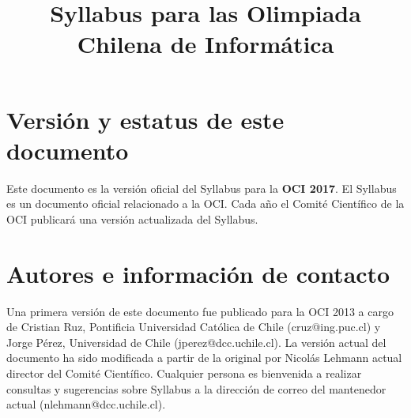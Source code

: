 \documentclass{article}
\begin{document}
\title{Syllabus para las Olimpiada Chilena de Informática}
\date{}
\maketitle

\section{Versión y estatus de este documento}
Este documento es la versión oficial del Syllabus para la \textbf{OCI 2017}.
El Syllabus es un documento oficial relacionado a la OCI.
Cada año el Comité Científico de la OCI publicará una versión actualizada del Syllabus.

\section{Autores e información de contacto}
Una primera versión de este documento fue publicado para la OCI 2013 a cargo de
Cristian Ruz, Pontificia Universidad Católica de Chile (cruz@ing.puc.cl) y
Jorge Pérez, Universidad de Chile (jperez@dcc.uchile.cl).
La versión actual del documento ha sido modificada a partir de la original por Nicolás
Lehmann actual director del Comité Científico.
Cualquier persona es bienvenida a realizar consultas y sugerencias sobre
Syllabus a la dirección de correo del mantenedor actual (nlehmann@dcc.uchile.cl).
\end{document}
